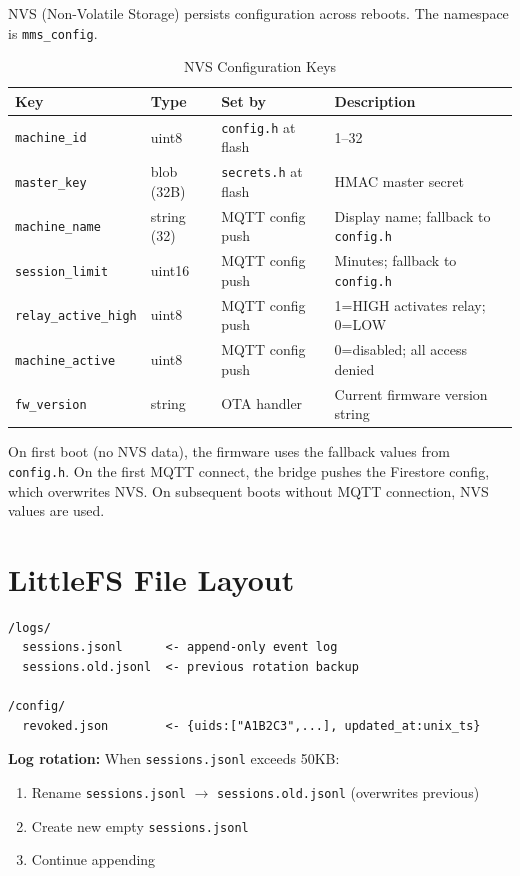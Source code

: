 NVS (Non-Volatile Storage) persists configuration across reboots. The namespace is \texttt{mms\_config}.

\begin{table}[H]
\centering
\caption{NVS Configuration Keys}
\begin{tabular}{L{3.5cm}C{2.5cm}L{3cm}L{5cm}}
\toprule
\textbf{Key} & \textbf{Type} & \textbf{Set by} & \textbf{Description} \\
\midrule
\texttt{machine\_id}   & uint8   & \texttt{config.h} at flash & 1--32 \\
\texttt{master\_key}   & blob (32B) & \texttt{secrets.h} at flash & HMAC master secret \\
\texttt{machine\_name} & string (32) & MQTT config push & Display name; fallback to \texttt{config.h} \\
\texttt{session\_limit} & uint16 & MQTT config push & Minutes; fallback to \texttt{config.h} \\
\texttt{relay\_active\_high} & uint8 & MQTT config push & 1=HIGH activates relay; 0=LOW \\
\texttt{machine\_active} & uint8 & MQTT config push & 0=disabled; all access denied \\
\texttt{fw\_version}  & string & OTA handler & Current firmware version string \\
\bottomrule
\end{tabular}
\end{table}

On first boot (no NVS data), the firmware uses the fallback values from \texttt{config.h}. On the first MQTT connect, the bridge pushes the Firestore config, which overwrites NVS. On subsequent boots without MQTT connection, NVS values are used.

\section{LittleFS File Layout}

\begin{verbatim}
/logs/
  sessions.jsonl      <- append-only event log
  sessions.old.jsonl  <- previous rotation backup

/config/
  revoked.json        <- {uids:["A1B2C3",...], updated_at:unix_ts}
\end{verbatim}

\textbf{Log rotation:} When \texttt{sessions.jsonl} exceeds 50KB:
\begin{enumerate}[leftmargin=1.5em]
    \item Rename \texttt{sessions.jsonl} $\rightarrow$ \texttt{sessions.old.jsonl} (overwrites previous)
    \item Create new empty \texttt{sessions.jsonl}
    \item Continue appending
\end{enumerate}

